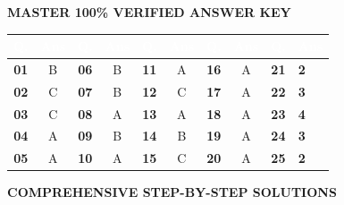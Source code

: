 \documentclass[11pt,a4paper]{article}
\begin{document}
\newpage

\begin{tcolorbox}[sectionbanner]
  {\large \textbf{\textsf{MASTER 100\% VERIFIED ANSWER KEY}}}
\end{tcolorbox}
\vspace{4pt}

\begin{center}
\renewcommand{\arraystretch}{1.25}
\small
\begin{tabularx}{\textwidth}{|>{\centering\arraybackslash}c|>{\centering\arraybackslash}c|>{\centering\arraybackslash}c|>{\centering\arraybackslash}c|>{\centering\arraybackslash}c|>{\centering\arraybackslash}c|>{\centering\arraybackslash}c|>{\centering\arraybackslash}c|>{\centering\arraybackslash}c|>{\centering\arraybackslash}X|}
\hline
\rowcolor{tableDarkHeader}
\textcolor{white}{\textbf{Q.}} & \textcolor{white}{\textbf{Ans}} & \textcolor{white}{\textbf{Q.}} & \textcolor{white}{\textbf{Ans}} & \textcolor{white}{\textbf{Q.}} & \textcolor{white}{\textbf{Ans}} & \textcolor{white}{\textbf{Q.}} & \textcolor{white}{\textbf{Ans}} & \textcolor{white}{\textbf{Q.}} & \textcolor{white}{\textbf{Ans}} \\
\hline
\rowcolor{white}
\textbf{01} & B & \textbf{06} & B & \textbf{11} & A & \textbf{16} & A & \textbf{21} & \textbf{2} \\
\hline
\rowcolor{tableStripe}
\textbf{02} & C & \textbf{07} & B & \textbf{12} & C & \textbf{17} & A & \textbf{22} & \textbf{3} \\
\hline
\rowcolor{white}
\textbf{03} & C & \textbf{08} & A & \textbf{13} & A & \textbf{18} & A & \textbf{23} & \textbf{4} \\
\hline
\rowcolor{tableStripe}
\textbf{04} & A & \textbf{09} & B & \textbf{14} & B & \textbf{19} & A & \textbf{24} & \textbf{3} \\
\hline
\rowcolor{white}
\textbf{05} & A & \textbf{10} & A & \textbf{15} & C & \textbf{20} & A & \textbf{25} & \textbf{2} \\
\hline
\end{tabularx}
\end{center}

\vspace{10pt}

\begin{tcolorbox}[sectionbanner]
  {\large \textbf{\textsf{COMPREHENSIVE STEP-BY-STEP SOLUTIONS}}}
\end{tcolorbox}
\vspace{4pt}
\end{document}
